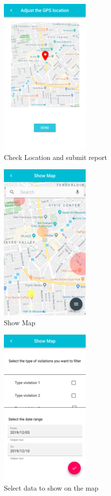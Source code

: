 \documentclass{article}
\begin{document}
\clearpage
\begin{figure}[!htb]
		\centering
		\includegraphics[height=7.9cm,keepaspectratio]{images/mockups/Create_report_GPS.png}
		\caption{Check Location and submit report}
\end{figure}

\begin{figure}[!htb]
		\centering
		\includegraphics[height=7.9cm,keepaspectratio]{images/mockups/Show_Map.png}
		\caption{Show Map}
\end{figure}

\clearpage
\begin{figure}[!htb]
		\centering
		\includegraphics[height=7.9cm,keepaspectratio]{images/mockups/Show_Map_Filter.png}
		\caption{Select data to show on the map}
\end{figure}
\end{document}
